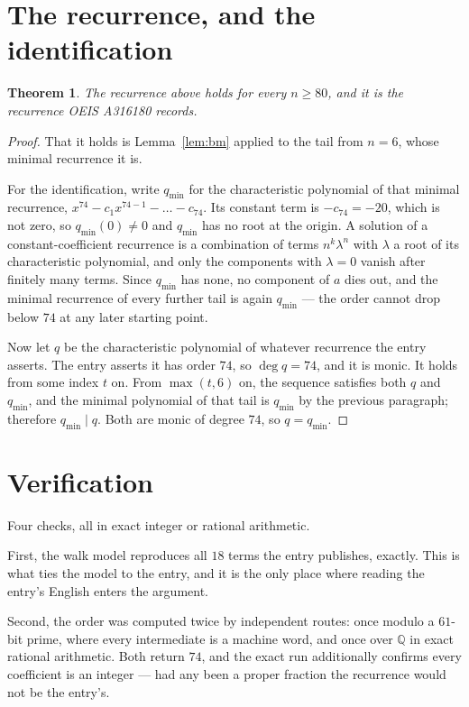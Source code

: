 \documentclass[11pt,a4paper]{article}
\theoremstyle{plain}
\newtheorem{theorem}{Theorem}
\theoremstyle{definition}
\begin{document}
\section{The recurrence, and the identification}

\begin{theorem}
The recurrence above holds for every $n\ge80$, and it is the recurrence OEIS A316180 records.
\end{theorem}

\begin{proof}
That it holds is Lemma~\ref{lem:bm} applied to the tail from $n=6$, whose minimal
recurrence it is.

For the identification, write $q_{\min}$ for the characteristic polynomial of that minimal
recurrence, $x^{74}-c_1x^{74-1}-\dots-c_{74}$. Its constant term is
$-c_{74}=-20$, which is not zero, so $q_{\min}(0)\neq0$ and $q_{\min}$ has no
root at the origin. A solution of a constant-coefficient recurrence is a combination of terms
$n^{k}\lambda^{n}$ with $\lambda$ a root of its characteristic polynomial, and only the
components with $\lambda=0$ vanish after finitely many terms. Since $q_{\min}$ has none, no
component of $a$ dies out, and the minimal recurrence of every further tail is again
$q_{\min}$ --- the order cannot drop below $74$ at any later starting point.

Now let $q$ be the characteristic polynomial of whatever recurrence the entry asserts. The
entry asserts it has order $74$, so $\deg q=74$, and it is monic. It holds from some
index $t$ on. From $\max(t,6)$ on, the sequence satisfies both $q$ and $q_{\min}$, and
the minimal polynomial of that tail is $q_{\min}$ by the previous paragraph; therefore
$q_{\min}\mid q$. Both are monic of degree $74$, so $q=q_{\min}$.
\end{proof}

\section{Verification}

Four checks, all in exact integer or rational arithmetic.

First, the walk model reproduces all $18$ terms the entry publishes, exactly. This is
what ties the model to the entry, and it is the only place where reading the entry's English
enters the argument.

Second, the order was computed twice by independent routes: once modulo a $61$-bit prime, where
every intermediate is a machine word, and once over $\mathbb{Q}$ in exact rational arithmetic.
Both return $74$, and the exact run additionally confirms every coefficient is an integer
--- had any been a proper fraction the recurrence would not be the entry's.
\end{document}
